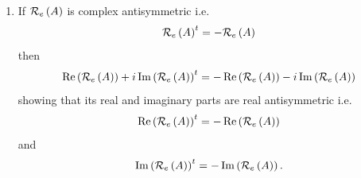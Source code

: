 \begin{remark}
\begin{enumerate}
\item If ${\cal R}_{e}\left( A\right) $ is complex antisymmetric i.e. 
\begin{equation}
{\cal R}_{e}\left( A\right) ^{t}=-{\cal R}_{e}\left( A\right)
\end{equation}%
then 
\begin{equation}
\mathop{\rm Re}%
\left( {\cal R}_{e}\left( A\right) \right) +i%
\mathop{\rm Im}%
\left( {\cal R}_{e}\left( A\right) \right) ^{t}=-%
\mathop{\rm Re}%
\left( {\cal R}_{e}\left( A\right) \right) -i%
\mathop{\rm Im}%
\left( {\cal R}_{e}\left( A\right) \right)
\end{equation}%
showing that its real and imaginary parts are real antisymmetric i.e. 
\begin{equation}
\mathop{\rm Re}%
\left( {\cal R}_{e}\left( A\right) \right) ^{t}=-%
\mathop{\rm Re}%
\left( {\cal R}_{e}\left( A\right) \right)
\end{equation}%
and 
\begin{equation}
\mathop{\rm Im}%
\left( {\cal R}_{e}\left( A\right) \right) ^{t}=-%
\mathop{\rm Im}%
\left( {\cal R}_{e}\left( A\right) \right) .
\end{equation}
\end{enumerate}
\end{remark}

